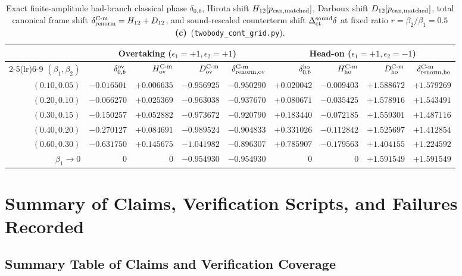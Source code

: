 \documentclass[11pt,a4paper]{article}
\newcommand{\Lc}{\textbf{(c)}}
\newcommand{\script}[1]{\texttt{#1}}
\begin{document}
\begin{table}[htbp]
\centering
\caption{Exact finite-amplitude bad-branch classical phase $\delta_{0,b}$, Hirota shift $H_{12}[p_{\rm can,matched}]$, Darboux shift $D_{12}[p_{\rm can,matched}]$, total canonical frame shift $\delta_{\rm renorm}^{\rm C\text{-m}}=H_{12}+D_{12}$, and sound-rescaled counterterm shift $\Delta_{\rm ct}^{\rm sound}\delta$ at fixed ratio $r=\beta_2/\beta_1=0.5$ \Lc\ (\script{twobody\_cont\_grid.py}).}
\label{tab:finite_beta}
\medskip
\small
\begin{tabular}{@{}rrrrrrrrr@{}}
\toprule
& \multicolumn{4}{c}{Overtaking ($\epsilon_1=+1,\epsilon_2=+1$)} & \multicolumn{4}{c}{Head-on ($\epsilon_1=+1,\epsilon_2=-1$)} \\
\cmidrule(lr){2-5}\cmidrule(lr){6-9}
$(\beta_1,\beta_2)$ & $\delta_{0,b}^{\rm ov}$ & $H_{\rm ov}^{\rm C\text{-m}}$ & $D_{\rm ov}^{\rm C\text{-m}}$ & $\delta_{\rm renorm,\rm ov}^{\rm C\text{-m}}$ & $\delta_{0,b}^{\rm ho}$ & $H_{\rm ho}^{\rm C\text{-m}}$ & $D_{\rm ho}^{\rm C\text{-m}}$ & $\delta_{\rm renorm,\rm ho}^{\rm C\text{-m}}$ \\
\midrule
$(0.10,0.05)$ & $-0.016501$ & $+0.006635$ & $-0.956925$ & $-0.950290$ & $+0.020042$ & $-0.009403$ & $+1.588672$ & $+1.579269$ \\
$(0.20,0.10)$ & $-0.066270$ & $+0.025369$ & $-0.963038$ & $-0.937670$ & $+0.080671$ & $-0.035425$ & $+1.578916$ & $+1.543491$ \\
$(0.30,0.15)$ & $-0.150257$ & $+0.052882$ & $-0.973672$ & $-0.920790$ & $+0.183440$ & $-0.072185$ & $+1.559301$ & $+1.487116$ \\
$(0.40,0.20)$ & $-0.270127$ & $+0.084691$ & $-0.989524$ & $-0.904833$ & $+0.331026$ & $-0.112842$ & $+1.525697$ & $+1.412854$ \\
$(0.60,0.30)$ & $-0.631750$ & $+0.145675$ & $-1.041982$ & $-0.896307$ & $+0.785907$ & $-0.179563$ & $+1.404155$ & $+1.224592$ \\
\midrule
$\beta_1\to 0$ & $0$ & $0$ & $-0.954930$ & $-0.954930$ & $0$ & $0$ & $+1.591549$ & $+1.591549$ \\
\bottomrule
\end{tabular}
\end{table}

\section{Summary of Claims, Verification Scripts, and Failures Recorded}

\subsection{Summary Table of Claims and Verification Coverage}
\end{document}
